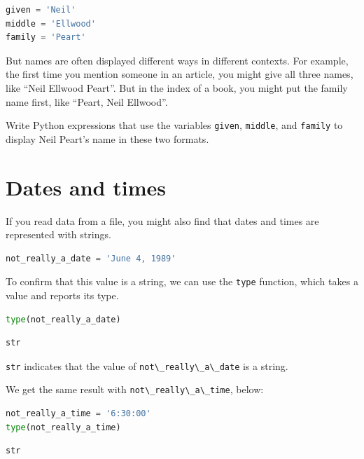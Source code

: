 \begin{lstlisting}[language=Python,style=source]
given = 'Neil'
middle = 'Ellwood'
family = 'Peart'
\end{lstlisting}

But names are often displayed different ways in different contexts. For
example, the first time you mention someone in an article, you might
give all three names, like ``Neil Ellwood Peart''. But in the index of a
book, you might put the family name first, like ``Peart, Neil Ellwood''.

Write Python expressions that use the variables
\passthrough{\lstinline!given!}, \passthrough{\lstinline!middle!}, and
\passthrough{\lstinline!family!} to display Neil Peart's name in these
two formats.

\hypertarget{dates-and-times}{%
\section{Dates and times}\label{dates-and-times}}

If you read data from a file, you might also find that dates and times
are represented with strings.

\begin{lstlisting}[language=Python,style=source]
not_really_a_date = 'June 4, 1989'
\end{lstlisting}

To confirm that this value is a string, we can use the
\passthrough{\lstinline!type!} function, which takes a value and reports
its type.

\begin{lstlisting}[language=Python,style=source]
type(not_really_a_date)
\end{lstlisting}

\begin{lstlisting}[style=output]
str
\end{lstlisting}

\passthrough{\lstinline!str!} indicates that the value of
\passthrough{\lstinline!not\_really\_a\_date!} is a string.

We get the same result with
\passthrough{\lstinline!not\_really\_a\_time!}, below:

\begin{lstlisting}[language=Python,style=source]
not_really_a_time = '6:30:00'
type(not_really_a_time)
\end{lstlisting}

\begin{lstlisting}[style=output]
str
\end{lstlisting}

